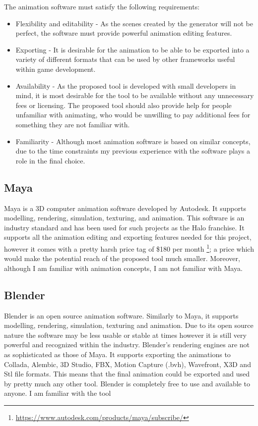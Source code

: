 The animation software must satisfy the following requirements:
\begin{itemize}
\item Flexibility and editability - As the scenes created by the generator will not be perfect, the software must provide powerful animation editing features.
\item Exporting - It is desirable for the animation to be able to be exported into a variety of different formats that can be used by other frameworks useful within game development.
\item Availability - As the proposed tool is developed with small developers in mind, it is most desirable for the tool to be available without any unnecessary fees or licensing. The proposed tool should also provide help for people unfamiliar with animating, who would be unwilling to pay additional fees for something they are not familiar with.
\item Familiarity - Although most animation software is based on similar concepts, due to the time constraints my previous experience with the software plays a role in the final choice.
\end{itemize}


\subsection{Maya}
Maya is a 3D computer animation software developed by Autodesk. It supports modelling, rendering, simulation, texturing, and animation. This software is an industry standard and has been used for such projects as the Halo franchise. It supports all the animation editing and exporting features needed for this project, however it comes with a pretty harsh price tag of \$180 per month \footnote{\url{https://www.autodesk.com/products/maya/subscribe/}}; a price which would make the potential reach of the proposed tool much smaller. Moreover, although I am familiar with animation concepts, I am not familiar with Maya.


\subsection{Blender}
Blender is an open source animation software. Similarly to Maya, it supports modelling, rendering, simulation, texturing and animation. Due to its open source nature the software may be less usable or stable at times however it is still very powerful and recognized within the industry. Blender's rendering engines are not as sophisticated as those of Maya. It supports exporting the animations to Collada, Alembic, 3D Studio, FBX, Motion Capture (.bvh), Wavefront, X3D and Stl file formats. This means that the final animation could be exported and used by pretty much any other tool. Blender is completely free to use and available to anyone. I am familiar with the tool


